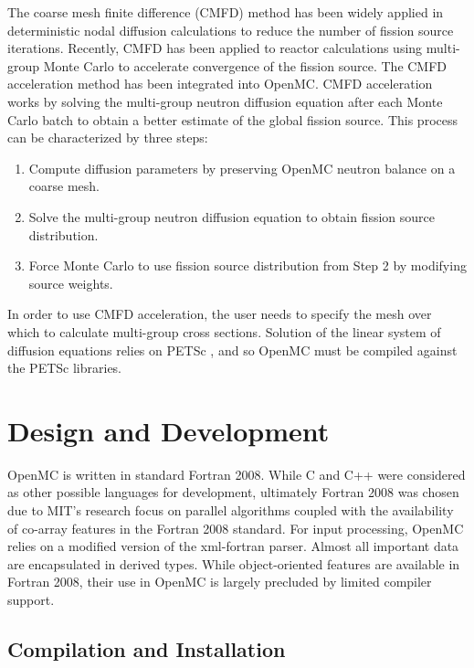 \documentclass{snamc2013}
\begin{document}
The coarse mesh finite difference (CMFD) method has been widely applied in
deterministic nodal diffusion calculations to reduce the number of fission
source iterations. Recently, CMFD has been applied to reactor calculations using
multi-group Monte Carlo \cite{physor-lee-2012} to accelerate convergence of the
fission source. The CMFD acceleration method has been integrated into
OpenMC. CMFD acceleration works by solving the multi-group neutron diffusion
equation after each Monte Carlo batch to obtain a better estimate of the global
fission source. This process can be characterized by three steps:
\begin{enumerate}
 \item Compute diffusion parameters by preserving OpenMC neutron balance on a
   coarse mesh.
 \item Solve the multi-group neutron diffusion equation to obtain fission source
   distribution.
 \item Force Monte Carlo to use fission source distribution from Step 2 by
   modifying source weights.
\end{enumerate}

In order to use CMFD acceleration, the user needs to specify the mesh over which
to calculate multi-group cross sections. Solution of the linear system of
diffusion equations relies on PETSc \cite{petsc-2013}, and so OpenMC must be
compiled against the PETSc libraries.

\section{Design and Development}

OpenMC is written in standard Fortran 2008. While C and C++ were considered as
other possible languages for development, ultimately Fortran 2008 was chosen due
to MIT's research focus on parallel algorithms coupled with the availability of
co-array features in the Fortran 2008 standard. For input processing, OpenMC
relies on a modified version of the xml-fortran \cite{markus-2008}
parser. Almost all important data are encapsulated in derived types. While
object-oriented features are available in Fortran 2008, their use in OpenMC is
largely precluded by limited compiler support.

\subsection{Compilation and Installation}
\end{document}
